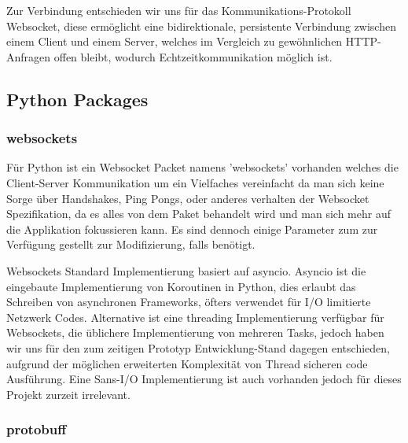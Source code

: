 Zur Verbindung entschieden wir uns für das Kommunikations-Protokoll Websocket, 
diese ermöglicht eine bidirektionale, persistente Verbindung zwischen einem Client und einem Server,
welches im Vergleich zu gewöhnlichen HTTP-Anfragen offen bleibt, wodurch Echtzeitkommunikation möglich ist.

\subsection{Python Packages}
\subsubsection{websockets}
Für Python ist ein Websocket Packet namens 'websockets' vorhanden welches die Client-Server Kommunikation
um ein Vielfaches vereinfacht da man sich keine Sorge über Handshakes, Ping Pongs, oder anderes verhalten
der Websocket Spezifikation, da es alles von dem Paket behandelt wird 
und man sich mehr auf die Applikation fokussieren kann. 
Es sind dennoch einige Parameter zum zur Verfügung gestellt zur Modifizierung, falls benötigt.

Websockets Standard Implementierung basiert auf asyncio.
%  
Asyncio ist die eingebaute Implementierung von Koroutinen in Python,
dies erlaubt das Schreiben von asynchronen Frameworks, 
öfters verwendet für I/O limitierte Netzwerk Codes.
Alternative ist eine threading Implementierung verfügbar für Websockets, 
die üblichere Implementierung von mehreren Tasks, 
jedoch haben wir uns für den zum zeitigen Prototyp Entwicklung-Stand dagegen entschieden,
aufgrund der möglichen erweiterten Komplexität von Thread sicheren code Ausführung.
Eine Sans-I/O Implementierung ist auch vorhanden jedoch für dieses Projekt zurzeit irrelevant.

\subsubsection{protobuff}


\subsection{}

